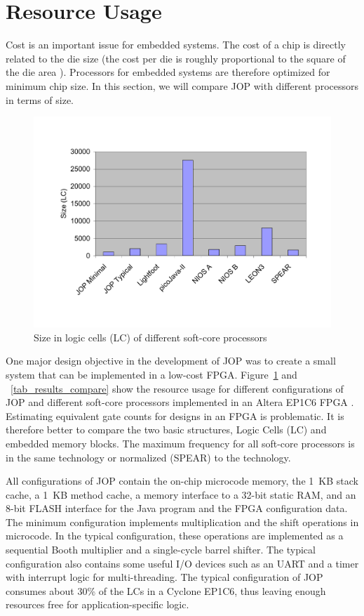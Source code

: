 \section{Resource Usage}

Cost is an important issue for embedded systems. The cost of a chip
is directly related to the die size (the cost per die is roughly
proportional to the square of the die area \cite{Hennessy02}).
Processors for embedded systems are therefore optimized for minimum
chip size. In this section, we will compare JOP with different
processors in terms of size.

\begin{figure}
    \centering
    \includegraphics[width=\excelwidth]{results/size}
    \caption{Size in logic cells (LC) of different soft-core
    processors}
    \label{fig:size}
\end{figure}

One major design objective in the development of JOP was to create a
small system that can be implemented in a low-cost FPGA.
Figure~\ref{fig:size} and \tablename~\ref{tab_results_compare} show
the resource usage for different configurations of JOP and different
soft-core processors implemented in an Altera EP1C6 FPGA
\cite{AltCyc}. Estimating equivalent gate counts for designs in an
FPGA is problematic. It is therefore better to compare the two basic
structures, Logic Cells (LC) and embedded memory blocks. The maximum
frequency for all soft-core processors is in the same technology or
normalized (SPEAR) to the technology.

All configurations of JOP contain the on-chip microcode memory, the
1~KB stack cache, a 1~KB method cache, a memory interface to a
32-bit static RAM, and an 8-bit FLASH interface for the Java program
and the FPGA configuration data. The minimum configuration
implements multiplication and the shift operations in microcode. In
the typical configuration, these operations are implemented as a
sequential Booth multiplier and a single-cycle barrel shifter. The
typical configuration also contains some useful I/O devices such as
an UART and a timer with interrupt logic for multi-threading. The
typical configuration of JOP consumes about 30\% of the LCs in a
Cyclone EP1C6, thus leaving enough resources free for
application-specific logic.

